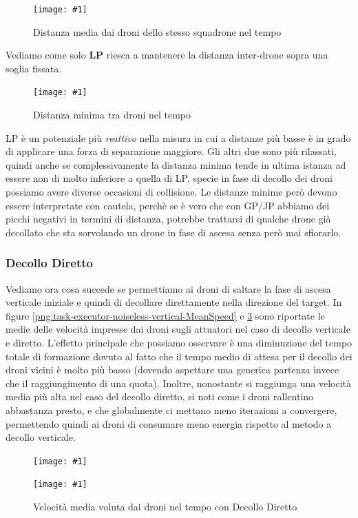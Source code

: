 \documentclass[a4paper,11pt,oneside, table]{article}
\newcommand{\putimage}[4] {
	\begin{figure}[H]
	    \centering
	    \texttt{[image: \#1]}
	    \caption{#2}\label{#3}
	\end{figure}
}
\newcommand{\putsubimage}[5] {
  \begin{minipage}{{#4}\linewidth}
	    \centering
      \texttt{[image: \#1]}
	    \caption{#2}\label{#3}
	\end{minipage}
}
\newcommand{\putimagecouple}[2] {
  \begin{figure}[!htb]
      \centering
      #1
      \hspace{0.5cm}
      #2
  \end{figure}
}
\begin{document}
\putimage{images/experiments/task-executor-noiseless-vertical/MeanDistancesWithinSquadron.png}{Distanza media dai droni dello stesso squadrone nel tempo}{png:task-executor-noiseless-vertical-MeanDistancesWithinSquadron}{0.99}

Vediamo come solo \textbf{LP} riesca a mantenere la distanza inter-drone sopra una soglia fissata.

\putimage{images/experiments/task-executor-noiseless-vertical/MinDistancesGlobally.png}{Distanza minima tra droni nel tempo}{png:task-executor-noiseless-vertical-MinDistancesGlobally}{0.99}

LP \`e un potenziale pi\`u \textit{reattivo} nella misura in cui a distanze pi\`u basse \`e in grado di applicare una forza di separazione maggiore. Gli altri due sono pi\`u rilassati, quindi anche se complessivamente la distanza minima tende in ultima istanza ad essere non di molto inferiore a quella di LP, specie in fase di decollo dei droni possiamo avere diverse occasioni di collisione.
Le distanze minime per\`o devono essere interpretate con cautela, perch\`e se \`e vero che con GP/JP abbiamo dei picchi negativi in termini di distanza, potrebbe trattarsi di qualche drone gi\`a decollato che sta sorvolando un drone in fase di ascesa senza per\`o mai sfiorarlo.

\subsubsection{Decollo Diretto}

Vediamo ora cosa succede se permettiamo ai droni di saltare la fase di ascesa verticale iniziale e quindi di decollare direttamente nella direzione del target.
In figure \ref{png:task-executor-noiseless-vertical-MeanSpeed} e \ref{png:task-executor-noiseless-direct-MeanSpeed} sono riportate le medie delle velocit\`a impresse dai droni sugli attuatori nel caso di decollo verticale e diretto.
L'effetto principale che possiamo osservare \`e una diminuzione del tempo totale di formazione dovuto al fatto che il tempo medio di attesa per il decollo dei droni vicini \`e molto pi\`u basso (dovendo aspettare una generica partenza invece che il raggiungimento di una quota).
Inoltre, nonostante si raggiunga una velocit\`a media pi\`u alta nel caso del decollo diretto, si noti come i droni rallentino abbastanza presto, e che globalmente ci mettano meno iterazioni a convergere, permettendo quindi ai droni di consumare meno energia rispetto al metodo a decollo verticale.

\putimagecouple
{\putsubimage{images/experiments/task-executor-noiseless-vertical/MeanSpeed.png}{Velocit\`a media voluta dai droni nel tempo con Decollo Verticale}{png:task-executor-noiseless-vertical-MeanSpeed}{0.4}{0.99}}
{\putsubimage{images/experiments/task-executor-noiseless-direct/MeanSpeed.png}{Velocit\`a media voluta dai droni nel tempo con Decollo Diretto}{png:task-executor-noiseless-direct-MeanSpeed}{0.4}{0.99}}
\end{document}
